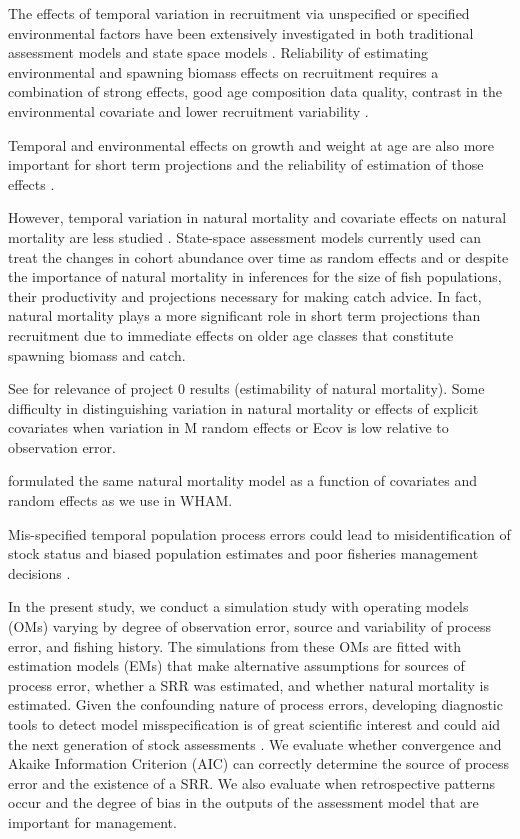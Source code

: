 \documentclass[
  12pt,
]{article}
\begin{document}
The effects of temporal variation in recruitment via unspecified or specified environmental factors have been extensively investigated in both traditional assessment models and state space models \citep[haltuchpapers]{myers98, milleretal16}. Reliability of estimating environmental and spawning biomass effects on recruitment requires a combination of strong effects, good age composition data quality, contrast in the environmental covariate and lower recruitment variability \citep{brittenetal_inreview, milleretal_inreview1}.

Temporal and environmental effects on growth and weight at age are also more important for short term projections and the reliability of estimation of those effects \citep{correaetal23, correaetal_inreview}.

However, temporal variation in natural mortality and covariate effects on natural mortality are less studied \citet{cadigan16}. State-space assessment models currently used can treat the changes in cohort abundance over time as random effects and or despite the importance of natural mortality in inferences for the size of fish populations, their productivity and projections necessary for making catch advice. In fact, natural mortality plays a more significant role in short term projections than recruitment due to immediate effects on older age classes that constitute spawning biomass and catch.

See \citet{milleretal_inreview1} for relevance of project 0 results (estimability of natural mortality). Some difficulty in distinguishing variation in natural mortality or effects of explicit covariates when variation in M random effects or Ecov is low relative to observation error.

\citet{derisoetal08} formulated the same natural mortality model as a function of covariates and random effects as we use in WHAM.

Mis-specified temporal population process errors could lead to misidentification of stock status and biased population estimates and poor fisheries management decisions \citep{trijouletetal20, legaultpalmer16, szuwalskietal18, croninpunt21, liljestrandetal24}.

In the present study, we conduct a simulation study with operating models (OMs) varying by degree of observation error, source and variability of process error, and fishing history. The simulations from these OMs are fitted with estimation models (EMs) that make alternative assumptions for sources of process error, whether a SRR was estimated, and whether natural mortality is estimated. Given the confounding nature of process errors, developing diagnostic tools to detect model misspecification is of great scientific interest and could aid the next generation of stock assessments \citep{augeretal21}. We evaluate whether convergence and Akaike Information Criterion (AIC) can correctly determine the source of process error and the existence of a SRR. We also evaluate when retrospective patterns occur and the degree of bias in the outputs of the assessment model that are important for management.
\end{document}
